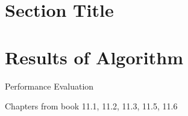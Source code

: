 \section{Section Title}
\section{Results of Algorithm}

Performance Evaluation

Chapters from book 11.1, 11.2, 11.3, 11.5, 11.6